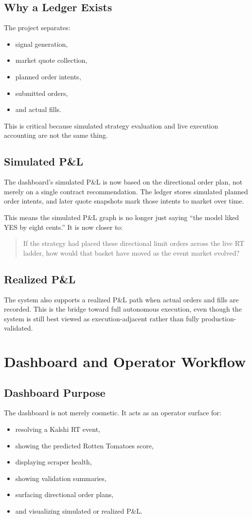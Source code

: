 \documentclass[11pt]{article}
\begin{document}
\subsection{Why a Ledger Exists}
The project separates:
\begin{itemize}[leftmargin=1.5em]
    \item signal generation,
    \item market quote collection,
    \item planned order intents,
    \item submitted orders,
    \item and actual fills.
\end{itemize}

This is critical because simulated strategy evaluation and live execution accounting are not the same thing.

\subsection{Simulated P\&L}
The dashboard's simulated P\&L is now based on the directional order plan, not merely on a single contract recommendation. The ledger stores simulated planned order intents, and later quote snapshots mark those intents to market over time.

This means the simulated P\&L graph is no longer just saying ``the model liked YES by eight cents.'' It is now closer to:
\begin{quote}
If the strategy had placed these directional limit orders across the live RT ladder, how would that basket have moved as the event market evolved?
\end{quote}

\subsection{Realized P\&L}
The system also supports a realized P\&L path when actual orders and fills are recorded. This is the bridge toward full autonomous execution, even though the system is still best viewed as execution-adjacent rather than fully production-validated.

\section{Dashboard and Operator Workflow}
\subsection{Dashboard Purpose}
The dashboard is not merely cosmetic. It acts as an operator surface for:
\begin{itemize}[leftmargin=1.5em]
    \item resolving a Kalshi RT event,
    \item showing the predicted Rotten Tomatoes score,
    \item displaying scraper health,
    \item showing validation summaries,
    \item surfacing directional order plans,
    \item and visualizing simulated or realized P\&L.
\end{itemize}
\end{document}
